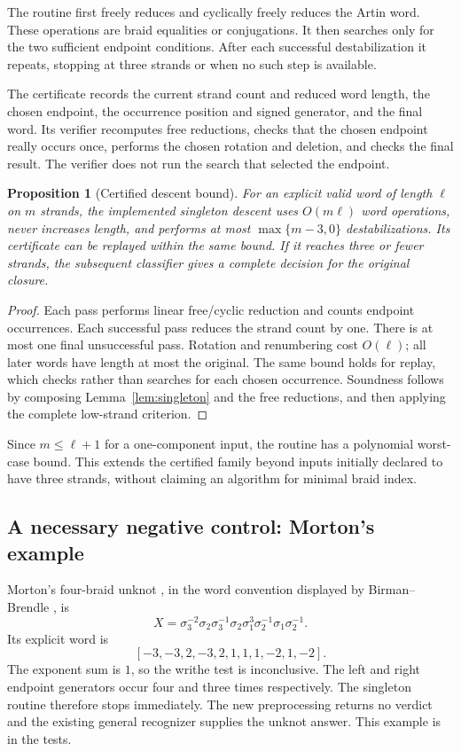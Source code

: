 \documentclass[11pt,letterpaper]{article}
\newtheorem{proposition}[theorem]{Proposition}
\theoremstyle{definition}
\begin{document}
The routine first freely reduces and cyclically freely reduces the Artin
word. These operations are braid equalities or conjugations.
It then searches only for the two sufficient endpoint conditions.
After each successful destabilization it repeats, stopping at three
strands or when no such step is available.

The certificate records the current strand count and reduced word length,
the chosen endpoint, the occurrence position and signed generator, and
the final word. Its verifier recomputes free reductions, checks that the
chosen endpoint really occurs once, performs the chosen rotation and
deletion, and checks the final result. The verifier does not run the
search that selected the endpoint.

\begin{proposition}[Certified descent bound]
\label{prop:descent}
For an explicit valid word of length \(\ell\) on \(m\) strands, the
implemented singleton descent uses \(O(m\ell)\) word operations,
never increases length, and performs at most \(\max\{m-3,0\}\) destabilizations.
Its certificate can be replayed within the same bound. If it reaches
three or fewer strands, the subsequent classifier gives a complete
decision for the original closure.
\end{proposition}
\begin{proof}
Each pass performs linear free/cyclic reduction and counts endpoint
occurrences. Each successful pass reduces the strand count by one.
There is at most one final unsuccessful pass. Rotation and renumbering
cost \(O(\ell)\); all later words have length at most the original.
The same bound holds for replay, which checks rather than searches for
each chosen occurrence. Soundness follows by composing
Lemma~\ref{lem:singleton} and the free reductions, and then applying the
complete low-strand criterion.
\end{proof}

Since \(m\le\ell+1\) for a one-component input, the routine has a
polynomial worst-case bound. This extends the certified family beyond
inputs initially declared to have three strands, without claiming an
algorithm for minimal braid index.

\subsection{A necessary negative control: Morton's example}

Morton's four-braid unknot \cite{morton}, in the word convention displayed
by Birman--Brendle \cite[Example 3.1]{birmansurvey}, is
\[
 X=\sigma_3^{-2}\sigma_2\sigma_3^{-1}\sigma_2
      \sigma_1^3\sigma_2^{-1}\sigma_1\sigma_2^{-1}.
\]
Its explicit word is
\[
 [-3,-3,2,-3,2,1,1,1,-2,1,-2].
\]
The exponent sum is \(1\), so the writhe test is inconclusive.
The left and right endpoint generators occur four and three times
respectively. The singleton routine therefore stops immediately.
The new preprocessing returns no verdict and the existing general
recognizer supplies the unknot answer. This example is in the tests.
\end{document}

